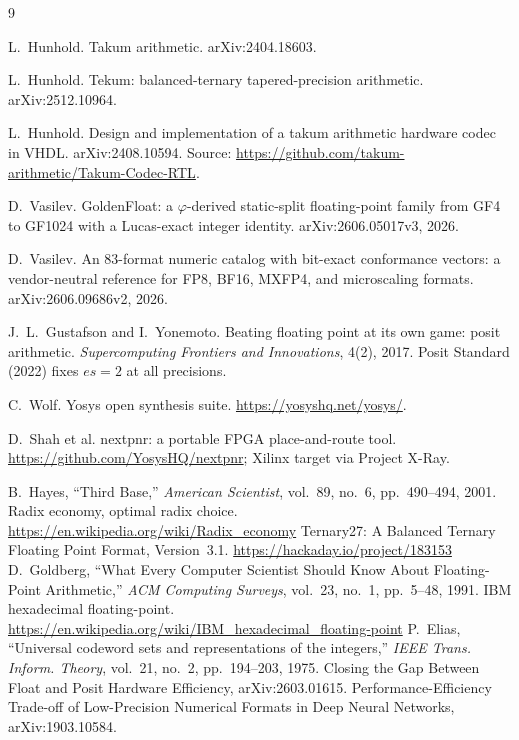\documentclass[11pt]{article}
\theoremstyle{definition}
\begin{document}
\begin{thebibliography}{9}

L.~Hunhold.
\newblock Takum arithmetic.
\newblock arXiv:2404.18603.

L.~Hunhold.
\newblock Tekum: balanced-ternary tapered-precision arithmetic.
\newblock arXiv:2512.10964.

L.~Hunhold.
\newblock Design and implementation of a takum arithmetic hardware codec in VHDL.
\newblock arXiv:2408.10594. Source: \url{https://github.com/takum-arithmetic/Takum-Codec-RTL}.

D.~Vasilev.
\newblock GoldenFloat: a $\varphi$-derived static-split floating-point family
from GF4 to GF1024 with a Lucas-exact integer identity.
\newblock arXiv:2606.05017v3, 2026.

D.~Vasilev.
\newblock An 83-format numeric catalog with bit-exact conformance vectors: a
vendor-neutral reference for FP8, BF16, MXFP4, and microscaling formats.
\newblock arXiv:2606.09686v2, 2026.

J.~L.~Gustafson and I.~Yonemoto.
\newblock Beating floating point at its own game: posit arithmetic.
\newblock \emph{Supercomputing Frontiers and Innovations}, 4(2), 2017.
\newblock Posit Standard (2022) fixes $es=2$ at all precisions.

C.~Wolf.
\newblock Yosys open synthesis suite.
\newblock \url{https://yosyshq.net/yosys/}.

D.~Shah et al.
\newblock nextpnr: a portable FPGA place-and-route tool.
\newblock \url{https://github.com/YosysHQ/nextpnr}; Xilinx target via Project X-Ray.

 B.~Hayes, ``Third Base,'' \emph{American Scientist}, vol.~89, no.~6, pp.~490--494, 2001.
 Radix economy, optimal radix choice. \url{https://en.wikipedia.org/wiki/Radix_economy}
 Ternary27: A Balanced Ternary Floating Point Format, Version~3.1. \url{https://hackaday.io/project/183153}
 D.~Goldberg, ``What Every Computer Scientist Should Know About Floating-Point Arithmetic,'' \emph{ACM Computing Surveys}, vol.~23, no.~1, pp.~5--48, 1991.
 IBM hexadecimal floating-point. \url{https://en.wikipedia.org/wiki/IBM_hexadecimal_floating-point}
 P.~Elias, ``Universal codeword sets and representations of the integers,'' \emph{IEEE Trans. Inform. Theory}, vol.~21, no.~2, pp.~194--203, 1975.
 Closing the Gap Between Float and Posit Hardware Efficiency, arXiv:2603.01615.
 Performance-Efficiency Trade-off of Low-Precision Numerical Formats in Deep Neural Networks, arXiv:1903.10584.
\end{thebibliography}
\end{document}

